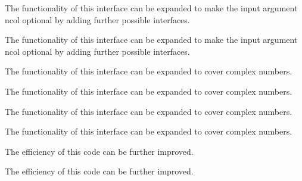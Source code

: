 \begin{DoxyRefList}
%
 The functionality of this interface can be expanded to make the input argument {\ttfamily ncol} optional by adding further possible interfaces. 
\item[Type \mbox{\hyperlink{interfaceMatrixDiag__mod_1_1getEye}{Matrix\+Diag\+\_\+mod\+::get\+Eye}} ]\label{todo__todo000034}%
%
 The functionality of this interface can be expanded to make the input argument {\ttfamily ncol} optional by adding further possible interfaces. 
\item[Type \mbox{\hyperlink{interfaceMatrixSymmetry__mod_1_1genMatSymFromMatLow}{Matrix\+Symmetry\+\_\+mod\+::gen\+Mat\+Sym\+From\+Mat\+Low}} ]\label{todo__todo000038}%
%
 The functionality of this interface can be expanded to cover complex numbers. 
\item[Type \mbox{\hyperlink{interfaceMatrixSymmetry__mod_1_1genMatSymFromMatUpp}{Matrix\+Symmetry\+\_\+mod\+::gen\+Mat\+Sym\+From\+Mat\+Upp}} ]\label{todo__todo000037}%
%
 The functionality of this interface can be expanded to cover complex numbers. 
\item[Type \mbox{\hyperlink{interfaceMatrixSymmetry__mod_1_1symmetrizeMatLow}{Matrix\+Symmetry\+\_\+mod\+::symmetrize\+Mat\+Low}} ]\label{todo__todo000036}%
%
 The functionality of this interface can be expanded to cover complex numbers. 
\item[Type \mbox{\hyperlink{interfaceMatrixSymmetry__mod_1_1symmetrizeMatUpp}{Matrix\+Symmetry\+\_\+mod\+::symmetrize\+Mat\+Upp}} ]\label{todo__todo000035}%
%
 The functionality of this interface can be expanded to cover complex numbers. 
\item[Subprogram \mbox{\hyperlink{namespaceSample__mod_af9dafbc79f11fc37f384877e49f3bf27}{Sample\+\_\+mod\+::get\+Cho\+Low\+Cov\+Upp}} (nd, np, Mean, Sample, Cho\+Low\+Cov\+Upp, Cho\+Dia)]\label{todo__todo000042}%
%
 The efficiency of this code can be further improved. 
\item[Subprogram \mbox{\hyperlink{namespaceSample__mod_a1e5daab49859d9c21c4ec3c916ec963d}{Sample\+\_\+mod\+::get\+Cho\+Low\+Cov\+Upp\+High\+Dim}} (nd, np, Mean, Sample, Cho\+Low\+Cov\+Upp, Cho\+Dia)]\label{todo__todo000043}%
%
 The efficiency of this code can be further improved. 
\item[Subprogram \mbox{\hyperlink{namespaceSample__mod_ab6c8a951bf35c59402a30d6d17a6d193}{Sample\+\_\+mod\+::merge\+Mean\+Cov\+Upp}} (nd, npA, MeanA, Cov\+UppA, npB, MeanB, Cov\+UppB, Mean\+AB, Cov\+Upp\+AB)]\label{todo__todo000044}%

\end{DoxyRefList}
